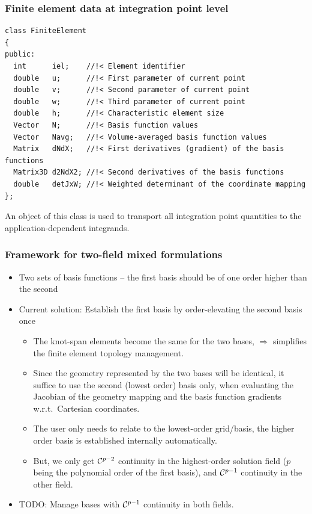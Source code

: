 \documentclass{beamer}
\begin{document}
\begin{frame}[fragile] %

 \frametitle{Finite element data at integration point level}

 \scriptsize
 \begin{verbatim}
class FiniteElement
{
public:
  int      iel;    //!< Element identifier
  double   u;      //!< First parameter of current point
  double   v;      //!< Second parameter of current point
  double   w;      //!< Third parameter of current point
  double   h;      //!< Characteristic element size
  Vector   N;      //!< Basis function values
  Vector   Navg;   //!< Volume-averaged basis function values
  Matrix   dNdX;   //!< First derivatives (gradient) of the basis functions
  Matrix3D d2NdX2; //!< Second derivatives of the basis functions
  double   detJxW; //!< Weighted determinant of the coordinate mapping
};
 \end{verbatim}

An object of this class is used to transport all integration point quantities to
the application-dependent integrands.
\end{frame}

\frame %
{
 \frametitle{Framework for two-field mixed formulations}

 \begin{itemize}
  \item<1-> Two sets of basis functions --
            the first basis should be of one order higher than the second
  \item<2-> Current solution: Establish the first basis by order-elevating
            the second basis once
  \begin{itemize}
   \item<3-> The knot-span elements become the same for the two bases,
             $\Rightarrow$ simplifies the finite element topology management.
   \item<4-> Since the geometry represented by the two bases will be identical,
             it suffice to use the second (lowest order) basis only,
             when evaluating the Jacobian of the geometry mapping
             and the basis function gradients w.r.t.\ Cartesian coordinates.
   \item<5-> The user only needs to relate to the lowest-order grid/basis, the
             higher order basis is established internally automatically.
   \vskip2mm
   \item<6-> But, we only get ${\cal C}^{p-2}$ continuity in the highest-order
             solution field ($p$ being the polynomial order of the first basis),
             and ${\cal C}^{p-1}$ continuity in the other field.
  \end{itemize}
  \item<7-> TODO: Manage bases with ${\cal C}^{p-1}$ continuity in both fields.
 \end{itemize}
}
\end{document}
